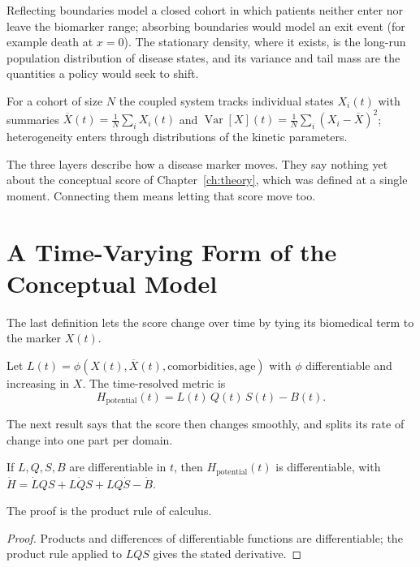 \begin{remark}
Reflecting boundaries model a closed cohort in which patients neither enter nor
leave the biomarker range; absorbing boundaries would model an exit event (for
example death at $x=0$). The stationary density, where it exists, is the
long-run population distribution of disease states, and its variance and tail
mass are the quantities a policy would seek to shift.
\end{remark}

For a cohort of size $N$ the coupled system tracks individual states $X_i(t)$
with summaries $\overline X(t)=\tfrac1N\sum_i X_i(t)$ and
$\operatorname{Var}[X](t)=\tfrac1N\sum_i(X_i-\overline X)^2$; heterogeneity enters
through distributions of the kinetic parameters.

The three layers describe how a disease marker moves. They say nothing yet
about the conceptual score of Chapter~\ref{ch:theory}, which was defined at a
single moment. Connecting them means letting that score move too.

\section{A Time-Varying Form of the Conceptual Model}
\label{sec:B_timevarying}

The last definition lets the score change over time by tying its biomedical
term to the marker $X(t)$.

\begin{definition}
\label{def:B_timevarying}
Let $L(t)=\phi(X(t),\overline X(t),\text{comorbidities},\text{age})$ with $\phi$
differentiable and increasing in $X$. The time-resolved metric is
\begin{equation}
H_{\text{potential}}(t)=L(t)\,Q(t)\,S(t)-B(t).
\label{eq:B_timevarying}
\end{equation}
\end{definition}

The next result says that the score then changes smoothly, and splits its rate
of change into one part per domain.

\begin{proposition}[Differentiability]
\label{prop:B_differentiable}
If $L,Q,S,B$ are differentiable in $t$, then $H_{\text{potential}}(t)$ is
differentiable, with
$\dot H = \dot L QS + L\dot Q S + LQ\dot S - \dot B$.
\end{proposition}
The proof is the product rule of calculus.
\begin{proof}
Products and differences of differentiable functions are differentiable; the
product rule applied to $LQS$ gives the stated derivative.
\end{proof}

